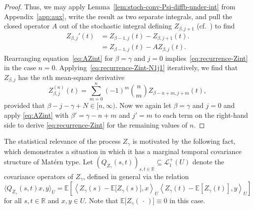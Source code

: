 \documentclass[reqno]{amsart}
\numberwithin{equation}{section}
\newcommand{\R}{\mathbb{R}}
\newcommand{\E}{\mathbb{E}}
\newcommand{\scalar}[2]{     \langle #1       \rangle_{ #2 }}
\newcommand{\Scalar}[2]{\left\langle #1 \right\rangle_{ #2 }}
\newcommand{\LO}{\mathscr L}
\theoremstyle{remark}
\theoremstyle{definition}
\begin{document}
\begin{proof}
	Thus, we may apply Lemma~\ref{lem:stoch-conv-Psi-diffb-under-int} from Appendix~\ref{app:aux},
	write the result as two separate integrals,
	and pull the
	closed operator $A$ out of the stochastic integral defining
	$Z_{\beta, j+1}$ (cf.~\cite[Proposition~4.30]{DaPrato2014}) to find
	\begin{align}
		Z_{\beta,j}'(t)
		&= 
		Z_{\beta - 1, j}(t) - 
		Z_{\beta, j+1}(t). \label{eq:recurrence-Zint-N1j1} 
		\\
		&= 
		Z_{\beta-1, j}(t)
		-
		A Z_{\beta, j}(t). \label{eq:AZint}
	\end{align}
	Rearranging equation~\eqref{eq:AZint} for $\beta = \gamma$ and $j = 0$
	implies~\eqref{eq:recurrence-Zint} in the case $n = 0$.
	Applying~\eqref{eq:recurrence-Zint-N1j1} iteratively, we find
	that $Z_{\beta,j}$ has the $n$th mean-square derivative
	\begin{equation}\label{eq:mean-square-deriv-Zbetaj}
		Z_{\beta,j}^{(n)}(t) 
		= 
		\sum_{m=0}^n (-1)^m {n \choose m} Z_{\beta-n+m, j + m}(t),
	\end{equation}
	provided that $\beta - j - \gamma + N \in [n,\infty)$. 
	Now we again let $\beta = \gamma$ and $j = 0$
	and apply \eqref{eq:AZint}
	with
	$\beta' = \gamma - n + m$ and
	$j' = m$ to each term on the right-hand side to derive \eqref{eq:recurrence-Zint} for the remaining values of $n$.
\end{proof}

The statistical relevance of the process $Z_\gamma$ is motivated by the following fact,
which demonstrates a situation in which it has a marginal
temporal covariance
structure of Mat\'ern type. Let $(Q_{Z_\gamma}(s,t))_{s,t\in \R} \subseteq \LO_1^+(U)$ denote
the covariance operators of $Z_\gamma$,
defined in general via the relation
% 
\begin{equation}
	\label{eq:cov-ops}
	\scalar{ Q_{Z_\gamma}(s,t) x, y }{U}  
	= 
	\E\left[ \Scalar{Z_\gamma(s)-\E \bigl[Z_\gamma(s)\bigr], x}{U} \Scalar{Z_\gamma(t)-\E[Z_\gamma(t)], y}{U} \right]
\end{equation}
%
for all $s,t \in \R$ and $x,y\in U$.
Note that $\E \bigl[Z_\gamma(\,\cdot\,)\bigr] \equiv 0$ in this case.
\end{document}
